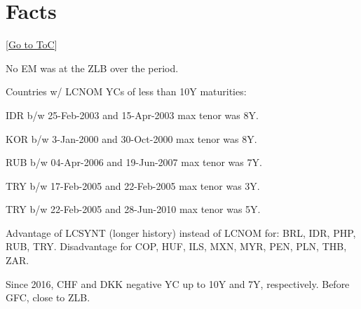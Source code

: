 \documentclass[12pt]{article}
\newcommand{\gototoc}{\vspace{-1.8cm} \null\hfill [\hyperlink{toc}{Go to ToC}] \newline}
\begin{document}
\section{Facts}
\gototoc
\begin{todolist}
	\item No EM was at the ZLB over the period.
	\item Countries w/ LCNOM YCs  of less than 10Y maturities:
	\begin{todolist}
		\item IDR b/w 25-Feb-2003 and 15-Apr-2003 max tenor was 8Y.
		\item KOR b/w 3-Jan-2000 and 30-Oct-2000 max tenor was 8Y.
		\item RUB b/w 04-Apr-2006 and 19-Jun-2007 max tenor was 7Y.
		\item TRY  b/w 17-Feb-2005 and 22-Feb-2005 max tenor was 3Y.
		\item TRY  b/w 22-Feb-2005 and 28-Jun-2010 max tenor was 5Y.
	\end{todolist}
	\item Advantage of LCSYNT (longer history) instead of LCNOM for: BRL, IDR, PHP, RUB, TRY. Disadvantage for COP, HUF, ILS, MXN, MYR, PEN, PLN, THB, ZAR.
	\item Since 2016, CHF and DKK negative YC up to 10Y and 7Y, respectively. Before GFC, close to ZLB.
\end{todolist}
\end{document}
